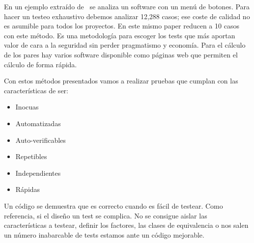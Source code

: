 En un ejemplo extraído de~\cite{Bach04pairwisetesting} se analiza un software con un menú de botones.
Para hacer un testeo exhaustivo debemos analizar 12,288 casos;
ese coste de calidad no es asumible para todos los proyectos.
En este mismo paper reducen a 10 casos con este método.
Es una metodología para escoger los tests que más aportan valor de cara a la seguridad sin perder pragmatismo y economía.
Para el cálculo de los pares hay varios software disponible como páginas web que permiten el cálculo de forma rápida.

Con estos métodos presentados vamos a realizar pruebas que cumplan con las características de ser:

\begin{itemize}
    \item Inocuas
    \item Automatizadas
    \item Auto-verificables
    \item Repetibles
    \item Independientes
    \item Rápidas
\end{itemize}

Un código se demuestra que es correcto cuando es fácil de testear.
Como referencia, si el diseño un test se complica.
No se consigue aislar las características a testear, definir los factores, las clases de equivalencia o nos salen un número inabarcable de tests estamos ante un código mejorable.